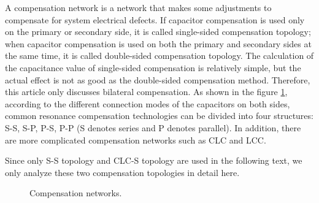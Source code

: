 A compensation network is a network that makes some adjustments to compensate for system electrical defects. If capacitor compensation is used only on the primary or secondary side, it is called single-sided compensation topology; when capacitor compensation is used on both the primary and secondary sides at the same time, it is called double-sided compensation topology. The calculation of the capacitance value of single-sided compensation is relatively simple, but the actual effect is not as good as the double-sided compensation method. Therefore, this article only discusses bilateral compensation. As shown in the figure \ref{compensation network}, according to the different connection modes of the capacitors on both sides, common resonance compensation technologies can be divided into four structures: S-S, S-P, P-S, P-P (S denotes series and P denotes parallel). In addition, there are more complicated compensation networks such as CLC and LCC.

Since only S-S topology and CLC-S topology are used in the following text, we only analyze these two compensation topologies in detail here.
\begin{figure}
    \centering
    \caption{Compensation networks.}
    \label{compensation network}
\end{figure}


